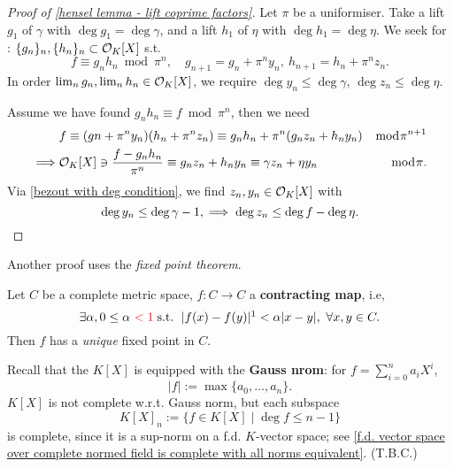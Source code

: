 \begin{proof}[Proof of \cref{hensel lemma - lift coprime factors}]
    Let $\pi$ be a uniformiser.
    Take a lift $g_1$ of $\gamma$ with $\deg g_1 = \deg \gamma$, and a lift $h_1$ of $\eta$ with $\deg h_1 = \deg\eta$.
    We seek for : $\{g_n\}_n, \{h_n\}_n\subset\mathcal{O}_K[X]$ s.t. \[f \equiv g_nh_n\bmod \pi^n,\quad g_{n + 1} = g_n + \pi^ny_n,\ h_{n+1} = h_n + \pi^nz_n .\]
    In order $\lim_n g_n, \lim_n h_n\in\mathcal{O}_K[X]$,
    we require $\deg y_n \le \deg \gamma$, $\deg z_n\le \deg \eta$.

    Assume we have found $g_nh_n\equiv f\bmod \pi^n$,
    then we need\begin{align*}
        &{} f\equiv (gn+\pi^ny_n)(h_n + \pi^nz_n)\equiv g_nh_n + \pi^n(g_nz_n + h_ny_n) &\bmod \pi^{n+1}\\
        \implies & \mathcal{O}_K[X]\ni \frac{f - g_nh_n}{\pi^n}\equiv g_nz_n+h_ny_n \equiv \gamma z_n + \eta y_n&\bmod\pi.
    \end{align*}
    Via \cref{bezout with deg condition},
    we find $z_n, y_n\in\mathcal{O}_K[X]$ with \[\deg y_n\le\deg\gamma -1,\implies\deg z_n \le \deg f - \deg\eta.\qedhere\]
\end{proof}


Another proof uses the \textit{fixed point theorem}.
\begin{lemma}
    Let $C$ be a complete metric space, $f : C\to C$ a \textbf{contracting map}, i.e, \[\exists\alpha, 0\le \alpha\ {\color{red}< 1} \st\ |f(x) - f(y)|\footnotemark <\alpha |x-y|,\ \forall x, y\in C. \]
    Then $f$ has a \textit{unique} fixed point in $C$.
\end{lemma}

Recall that the $K[X]$ is equipped with the \textbf{Gauss nrom}: for $f = \sum_{i=0}^n a_iX^i$,
\[|f| := \max\{a_0, \dots, a_n\}.\]
$K[X]$ is not complete w.r.t.\! Gauss norm,
but each subspace\[K[X]_n := \{f\in K[X]\mid \deg f\le n - 1\}\]
is complete, since it is a sup-norm on a f.d.\! $K$-vector space;
see \cref{f.d. vector space over complete normed field is complete with all norms equivalent}.
(T.B.C.)
    

